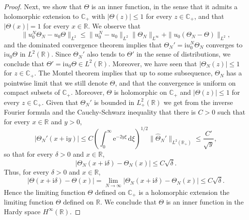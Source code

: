 \documentclass[english, 12pt]{amsart}%
\newcommand{\R}{\mathbb{R}}
\newcommand{\C}{\mathbb{C}}
\newcommand{\ii}{\mathrm{i}}
\newcommand{\dd}{\,\mathrm{d}}
\newcommand{\ee}{\mathrm{e}}
\numberwithin{equation}{section}
\begin{document}
\begin{proof}
Next, we show that $\Theta$ is an inner function, in the sense that it admits a holomorphic extension to $\C_+$ with $|\Theta(z)|\leq 1$ for every $z\in \C_+$, and that $|\Theta(x)|=1$ for every $x\in\R$. We observe that
\[
\|u_0^N\Theta_N-u_0\Theta\|_{L^2}\leq \|u_0^N-u_0\|_{L^2}\|\Theta_N\|_{L^\infty}+\| u_0(\Theta_N-\Theta)\|_{L^2},
\]
and the dominated convergence theorem implies that $\Theta_N'=\ii u_0^N\Theta_N$ converges to $\ii u_0\Theta$ in $L^2(\R)$. Since $\Theta_N'$ also tends to $\Theta'$ in the sense of distributions, we conclude that $\Theta'=\ii u_0\Theta\in L^2(\R)$.
Moreover, we have seen that $|\Theta_N(z)|\leq 1$ for $z\in\C_+$. The Montel theorem implies that up to some subsequence, $\Theta_N$ has a pointwise limit that we still denote $\Theta$, and that the convergence is uniform on compact subsets of $\C_+$. Moreover, $\Theta$ is holomorphic on $\C_+$ and $|\Theta(z)|\leq 1$ for every $z\in\C_+$.
Given that $\Theta_N'$ is bounded in $L^2_+(\R)$ we get from the inverse Fourier formula and the Cauchy-Schwarz inequality that  there is $C>0$ such that for every $x\in\R$ and $y>0$, 
\[
|\Theta_N'(x+\ii y)|\leq C\left(\int_0^\infty \ee^{-2y\xi}\dd\xi\right)^{1/2}\|\widehat{\Theta}_N'\|_{L^2(\R_+)}
\leq \frac{C'}{\sqrt{y}},
\]
so that  for every $\delta>0$ and $x\in\R$,
\[
|\Theta_N(x+\ii\delta)-\Theta_N(x)|	\leq C\sqrt{\delta}.
\]
Thus, for every $\delta>0$ and $x\in\R$,
\[
|\Theta(x+\ii\delta)-\Theta(x)|
=\lim_{N\to\infty} |\Theta_N(x+\ii\delta)-\Theta_N(x)|
\leq C\sqrt{\delta}.
\]
Hence the limiting function $\Theta$ defined on $\C_+$ is a holomorphic extension the limiting function $\Theta$ defined on $\R$. We conclude that $\Theta$ is an inner function in the Hardy space $H^\infty(\R)$.


\end{proof}
\end{document}
